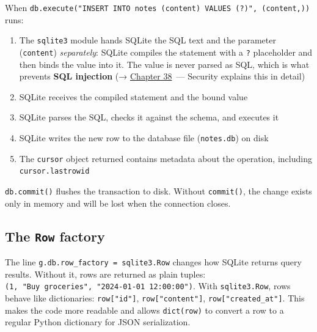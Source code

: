 When \texttt{db.}\allowbreak{}\texttt{execute("INSERT\ INTO\ notes\ (content)\ VALUES\ (?}\allowbreak{}\texttt{)",}\allowbreak{}\texttt{\ (content,}\allowbreak{}\texttt{))} runs:

\begin{enumerate}
\def\labelenumi{\arabic{enumi}.}
\tightlist
\item
  The \texttt{sqlite3} module hands SQLite the SQL text and the parameter (\texttt{content}) \emph{separately}: SQLite compiles the statement with a \texttt{?} placeholder and then binds the value into it. The value is never parsed as SQL, which is what prevents \textbf{SQL injection} (→ \hyperref[ch:38-security]{Chapter 38}~--- Security explains this in detail)
\item
  SQLite receives the compiled statement and the bound value
\item
  SQLite parses the SQL, checks it against the schema, and executes it
\item
  SQLite writes the new row to the database file (\texttt{notes.db}) on disk
\item
  The \texttt{cursor} object returned contains metadata about the operation, including \texttt{cursor.lastrowid}
\end{enumerate}

\noindent{}\texttt{db.commit()} flushes the transaction to disk. Without \texttt{commit()}, the change exists only in memory and will be lost when the connection closes.

\subsection*{\texorpdfstring{The \texttt{Row} factory}{The Row factory}}\label{05-internal-request-execution:the-row-factory}

The line \texttt{g.}\allowbreak{}\texttt{db.}\allowbreak{}\texttt{row\_}\allowbreak{}\texttt{factory\ =}\allowbreak{}\texttt{\ sqlite3.}\allowbreak{}\texttt{Row} changes how SQLite returns query results. Without it, rows are returned as plain tuples: \texttt{(1,}\allowbreak{}\texttt{\ "Buy\ groceries",}\allowbreak{}\texttt{\ "2024-}\allowbreak{}\texttt{01-}\allowbreak{}\texttt{01\ 12:}\allowbreak{}\texttt{00:}\allowbreak{}\texttt{00")}. With \texttt{sqlite3.Row}, rows behave like dictionaries: \texttt{row{[}"id"{]}}, \texttt{row{[}"content"{]}}, \texttt{row{[}"created\_at"{]}}. This makes the code more readable and allows \texttt{dict(row)} to convert a row to a regular Python dictionary for JSON serialization.

